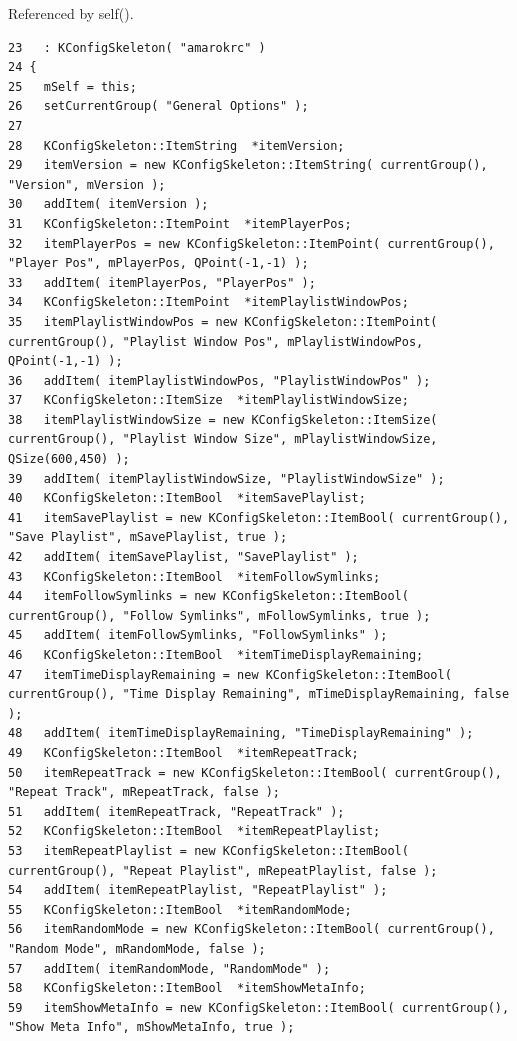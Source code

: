 Referenced by self().



\footnotesize\begin{verbatim}23   : KConfigSkeleton( "amarokrc" )
24 {
25   mSelf = this;
26   setCurrentGroup( "General Options" );
27 
28   KConfigSkeleton::ItemString  *itemVersion;
29   itemVersion = new KConfigSkeleton::ItemString( currentGroup(), "Version", mVersion );
30   addItem( itemVersion );
31   KConfigSkeleton::ItemPoint  *itemPlayerPos;
32   itemPlayerPos = new KConfigSkeleton::ItemPoint( currentGroup(), "Player Pos", mPlayerPos, QPoint(-1,-1) );
33   addItem( itemPlayerPos, "PlayerPos" );
34   KConfigSkeleton::ItemPoint  *itemPlaylistWindowPos;
35   itemPlaylistWindowPos = new KConfigSkeleton::ItemPoint( currentGroup(), "Playlist Window Pos", mPlaylistWindowPos, QPoint(-1,-1) );
36   addItem( itemPlaylistWindowPos, "PlaylistWindowPos" );
37   KConfigSkeleton::ItemSize  *itemPlaylistWindowSize;
38   itemPlaylistWindowSize = new KConfigSkeleton::ItemSize( currentGroup(), "Playlist Window Size", mPlaylistWindowSize, QSize(600,450) );
39   addItem( itemPlaylistWindowSize, "PlaylistWindowSize" );
40   KConfigSkeleton::ItemBool  *itemSavePlaylist;
41   itemSavePlaylist = new KConfigSkeleton::ItemBool( currentGroup(), "Save Playlist", mSavePlaylist, true );
42   addItem( itemSavePlaylist, "SavePlaylist" );
43   KConfigSkeleton::ItemBool  *itemFollowSymlinks;
44   itemFollowSymlinks = new KConfigSkeleton::ItemBool( currentGroup(), "Follow Symlinks", mFollowSymlinks, true );
45   addItem( itemFollowSymlinks, "FollowSymlinks" );
46   KConfigSkeleton::ItemBool  *itemTimeDisplayRemaining;
47   itemTimeDisplayRemaining = new KConfigSkeleton::ItemBool( currentGroup(), "Time Display Remaining", mTimeDisplayRemaining, false );
48   addItem( itemTimeDisplayRemaining, "TimeDisplayRemaining" );
49   KConfigSkeleton::ItemBool  *itemRepeatTrack;
50   itemRepeatTrack = new KConfigSkeleton::ItemBool( currentGroup(), "Repeat Track", mRepeatTrack, false );
51   addItem( itemRepeatTrack, "RepeatTrack" );
52   KConfigSkeleton::ItemBool  *itemRepeatPlaylist;
53   itemRepeatPlaylist = new KConfigSkeleton::ItemBool( currentGroup(), "Repeat Playlist", mRepeatPlaylist, false );
54   addItem( itemRepeatPlaylist, "RepeatPlaylist" );
55   KConfigSkeleton::ItemBool  *itemRandomMode;
56   itemRandomMode = new KConfigSkeleton::ItemBool( currentGroup(), "Random Mode", mRandomMode, false );
57   addItem( itemRandomMode, "RandomMode" );
58   KConfigSkeleton::ItemBool  *itemShowMetaInfo;
59   itemShowMetaInfo = new KConfigSkeleton::ItemBool( currentGroup(), "Show Meta Info", mShowMetaInfo, true );

\end{verbatim}
